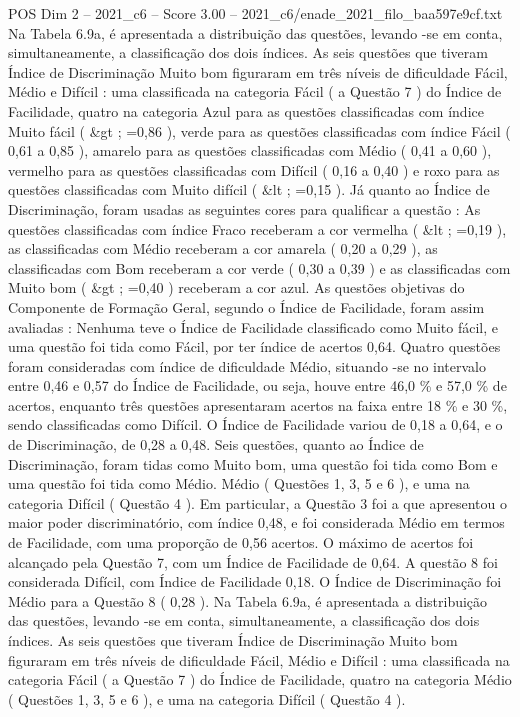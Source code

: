 \begin{textsample}{POS Dim 2 – 2021\_c6 – Score 3.00 – 2021\_c6/enade\_2021\_filo\_baa597e9cf.txt}
Na Tabela 6.9a, é apresentada a distribuição das questões, levando -se em conta, simultaneamente, a classificação dos dois índices.
As seis questões que tiveram Índice de Discriminação Muito bom figuraram em três níveis de dificuldade Fácil, Médio e Difícil : uma classificada na categoria Fácil ( a Questão 7 ) do Índice de Facilidade, quatro na categoria Azul para as questões classificadas com índice Muito fácil ( \&gt ; =0,86 ), verde para as questões classificadas com índice Fácil ( 0,61 a 0,85 ), amarelo para as questões classificadas com Médio ( 0,41 a 0,60 ), vermelho para as questões classificadas com Difícil ( 0,16 a 0,40 ) e roxo para as questões classificadas com Muito difícil ( \&lt ; =0,15 ).
Já quanto ao Índice de Discriminação, foram usadas as seguintes cores para qualificar a questão : As questões classificadas com índice Fraco receberam a cor vermelha ( \&lt ; =0,19 ), as classificadas com Médio receberam a cor amarela ( 0,20 a 0,29 ), as classificadas com Bom receberam a cor verde ( 0,30 a 0,39 ) e as classificadas com Muito bom ( \&gt ; =0,40 ) receberam a cor azul.
As questões objetivas do Componente de Formação Geral, segundo o Índice de Facilidade, foram assim avaliadas : Nenhuma teve o Índice de Facilidade classificado como Muito fácil, e uma questão foi tida como Fácil, por ter índice de acertos 0,64.
Quatro questões foram consideradas com índice de dificuldade Médio, situando -se no intervalo entre 0,46 e 0,57 do Índice de Facilidade, ou seja, houve entre 46,0 \% e 57,0 \% de acertos, enquanto três questões apresentaram acertos na faixa entre 18 \% e 30 \%, sendo classificadas como Difícil.
O Índice de Facilidade variou de 0,18 a 0,64, e o de Discriminação, de 0,28 a 0,48.
Seis questões, quanto ao Índice de Discriminação, foram tidas como Muito bom, uma questão foi tida como Bom e uma questão foi tida como Médio.
Médio ( Questões 1, 3, 5 e 6 ), e uma na categoria Difícil ( Questão 4 ).
Em particular, a Questão 3 foi a que apresentou o maior poder discriminatório, com índice 0,48, e foi considerada Médio em termos de Facilidade, com uma proporção de 0,56 acertos.
O máximo de acertos foi alcançado pela Questão 7, com um Índice de Facilidade de 0,64.
A questão 8 foi considerada Difícil, com Índice de Facilidade 0,18.
O Índice de Discriminação foi Médio para a Questão 8 ( 0,28 ).
Na Tabela 6.9a, é apresentada a distribuição das questões, levando -se em conta, simultaneamente, a classificação dos dois índices.
As seis questões que tiveram Índice de Discriminação Muito bom figuraram em três níveis de dificuldade Fácil, Médio e Difícil : uma classificada na categoria Fácil ( a Questão 7 ) do Índice de Facilidade, quatro na categoria Médio ( Questões 1, 3, 5 e 6 ), e uma na categoria Difícil ( Questão 4 ).

\end{textsample}
